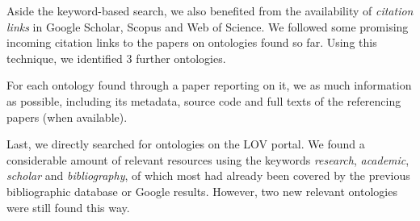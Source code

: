 



Aside the keyword-based search, we also benefited from the availability of \emph{citation links} in Google Scholar, Scopus and Web of Science. 
We followed some promising incoming citation links to the papers on ontologies found so far. 
Using this technique, we identified 3 further ontologies.

For each ontology found through a paper reporting on it, we as much information as possible, including its metadata, source code and full texts of the referencing papers (when available). 





Last, 
we directly searched for ontologies  %
on the LOV portal. We %
found a considerable amount of relevant resources using the keywords \textit{research}, \textit{academic}, \textit{scholar} and \textit{bibliography}, of which most had already been
covered by the previous bibliographic database or Google results.  
However, two new relevant ontologies were still found this way. %


